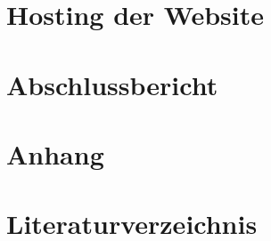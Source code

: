\documentclass[12pt,a4paper]{article}
\begin{document}
\section{Hosting der Website}


\section{Abschlussbericht}


\section{Anhang}


\section{Literaturverzeichnis}

\end{document}
